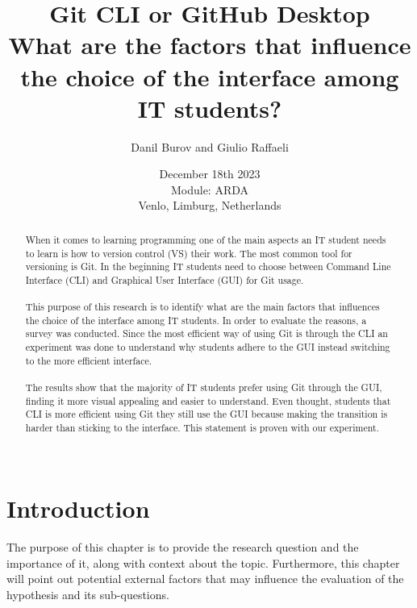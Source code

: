 \documentclass[]{report}
\title{Git CLI or GitHub Desktop \\ What are the factors that influence the choice of the interface among IT students?}
\author{Danil Burov and Giulio Raffaeli}
\date{December 18th 2023\\Module: ARDA \\Venlo, Limburg, Netherlands}
\begin{document}
	
	\maketitle
	

	\begin{abstract}
		When it comes to learning programming one of the main aspects an IT student needs to learn is how to version control (VS) their work. The most common tool for versioning is Git. In the beginning IT students need to choose between Command Line Interface (CLI) and Graphical User Interface (GUI) for Git usage. \\\\
		
		This purpose of this research is to identify what are the main factors that influences the choice of the interface among IT students. In order to evaluate the reasons, a survey was conducted. Since the most efficient way of using Git is through the CLI an experiment was done to understand why students adhere to the GUI instead switching to the more efficient interface.\\\\
		The results show that the majority of IT students prefer using Git through the GUI, finding it more visual appealing and easier to understand. Even thought, students that CLI is more efficient using Git they still use the GUI because making the transition is harder than sticking to the interface. This statement is proven with our experiment.\\\\
		
	\end{abstract}
	\tableofcontents
	\setcounter{page}{3}
	\listoffigures %
	\pagebreak
	
	
	\section{Introduction}
	The purpose of this chapter is to provide the research question and the importance of it, along with context about the topic. Furthermore, this chapter will point out potential external factors that may influence the evaluation of the hypothesis and its sub-questions. \\
\end{document}
